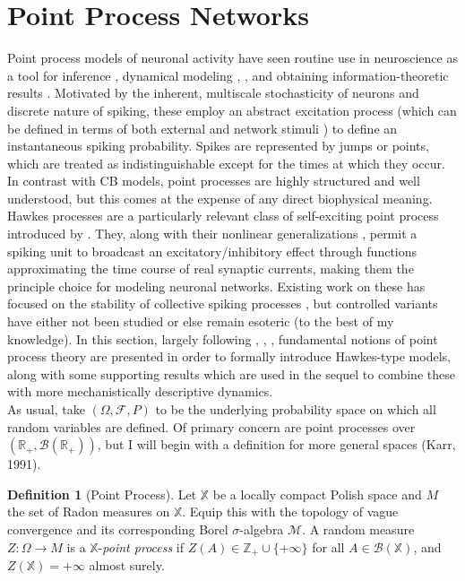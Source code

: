 \documentclass[12pt, oneside]{report}
\newcommand{\mbb}[1]{\mathbb{#1}}
\newcommand{\1}[1]{\mathbbm{1}_{\{#1\}}}
\newcommand{\mc}[1]{\mathcal{#1}}
\theoremstyle{definition}
\newtheorem{definition}[theorem]{Definition}
\begin{document}
\section{Point Process Networks}\label{sec5}
Point process models of neuronal activity have seen routine use in neuroscience as a tool for inference
\cite{Brillinger_1988}, \cite{Chornoboy_Schramm_Karr_1988} dynamical modeling \cite{Reynaud-Bouret_Rivoirard_Grammont_Tuleau-Malot_2014},
\cite{Chevallier_Caceres_Doumic_Reynaud_Bouret_2015}, \cite{Gerhard_Deger_Truccolo_2017} and obtaining
information-theoretic results \cite{Johnson_1996}. Motivated by the inherent,
multiscale stochasticity of neurons \cite{Faisal_Selen_Wolpert_2008} and discrete nature of
spiking, these employ an abstract excitation process
(which can be defined in terms of both external and network stimuli \cite{Pillow_Shlens_Paninski_Sher_Litke_Chichilnisky_Simoncelli_2008})
to define an instantaneous spiking probability. Spikes are
represented by jumps or points, which are treated as indistinguishable except
for the times at which they occur. In contrast with CB models, point processes
are highly structured and well understood, but this comes at the expense of any
direct biophysical meaning. Hawkes processes are a particularly relevant class
of self-exciting point process introduced by \cite{Hawkes_1971}. They, along with
their nonlinear generalizations \cite{Bremaud_Massoulié_1996}, permit a
spiking unit to broadcast an excitatory/inhibitory effect through functions
approximating the time course of real synaptic currents, making them the
principle choice for modeling neuronal networks. Existing work on these has
focused on the stability of collective spiking processes \cite{Bremaud_Massoulié_1996}, \cite{Borovkov_Decrouez_Gilson_2014} but controlled variants have either not been
studied or else remain esoteric (to the best of my knowledge). In this section, largely following
\cite{Bremaud_1981}, \cite{Chevallier_Caceres_Doumic_Reynaud_Bouret_2015}, \cite{Chevallier_2017}, fundamental notions of
point process theory are presented in order to formally introduce
Hawkes-type models, along with some supporting results which are used in
the sequel to combine these with more mechanistically descriptive dynamics.\\[5pt]
\indent As usual, take $(\Omega,\mc{F},P)$ to be the underlying probability
space on which all random variables are defined. Of primary concern are point
processes over $(\mbb{R}_+,\mc{B}(\mbb{R}_+))$, but I will begin with a
definition for more general spaces (Karr, 1991).
\begin{definition}[Point Process]\label{def8} Let $\mbb{X}$ be a locally compact
    Polish space and $M$ the set of Radon measures on $\mbb{X}$. Equip this with
    the topology of vague convergence and its corresponding Borel
    $\sigma$-algebra $\mc{M}$. A random measure $Z:\Omega\rightarrow M$ is a
    $\mbb{X}$-{\it point process} if $Z(A)\in\mbb{Z}_+\cup\{+\infty\}$ for all
    $A\in\mc{B}(\mbb{X})$, and $Z(\mbb{X})=+\infty$ almost surely.
\end{definition}
\end{document}
